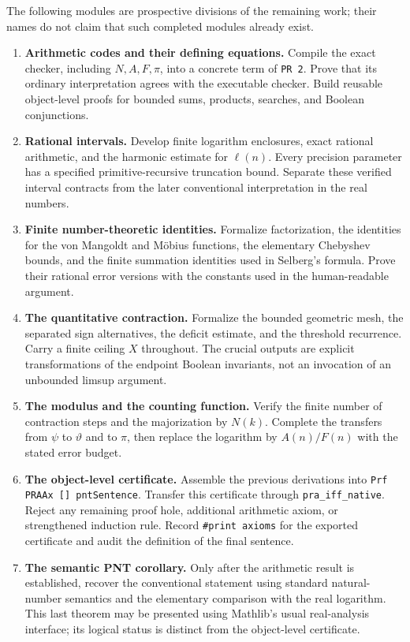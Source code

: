 The following modules are prospective divisions of the remaining work;
their names do not claim that such completed modules already exist.
\begin{enumerate}
\item \textbf{Arithmetic codes and their defining equations.}
Compile the exact checker, including $N,A,F,\pi$, into a concrete term of
\texttt{PR 2}.  Prove that its ordinary interpretation agrees with the
executable checker.  Build reusable object-level proofs for bounded sums,
products, searches, and Boolean conjunctions.

\item \textbf{Rational intervals.}
Develop finite logarithm enclosures, exact rational arithmetic, and the
harmonic estimate for $\ell(n)$.  Every precision parameter has a specified
primitive-recursive truncation bound.  Separate these verified interval
contracts from the later conventional interpretation in the real numbers.

\item \textbf{Finite number-theoretic identities.}
Formalize factorization, the identities for the von Mangoldt and M\"obius
functions, the elementary Chebyshev bounds, and the finite summation
identities used in Selberg's formula.  Prove their rational error versions
with the constants used in the human-readable argument.

\item \textbf{The quantitative contraction.}
Formalize the bounded geometric mesh, the separated sign alternatives,
the deficit estimate, and the threshold recurrence.  Carry a finite
ceiling $X$ throughout.  The crucial outputs are explicit transformations
of the endpoint Boolean invariants, not an invocation of an unbounded
limsup argument.

\item \textbf{The modulus and the counting function.}
Verify the finite number of contraction steps and the majorization by
$N(k)$.  Complete the transfers from $\psi$ to $\vartheta$ and to $\pi$,
then replace the logarithm by $A(n)/F(n)$ with the stated error budget.

\item \textbf{The object-level certificate.}
Assemble the previous derivations into
\texttt{Prf PRAAx [] pntSentence}.  Transfer this certificate through
\texttt{pra\_iff\_native}.  Reject any remaining proof hole, additional
arithmetic axiom, or strengthened induction rule.  Record
\texttt{\#print axioms} for the exported certificate and audit the
definition of the final sentence.

\item \textbf{The semantic PNT corollary.}
Only after the arithmetic result is established, recover the conventional
statement using standard natural-number semantics and the elementary
comparison with the real logarithm.  This last theorem may be presented
using Mathlib's usual real-analysis interface; its logical status is
distinct from the object-level certificate.
\end{enumerate}

